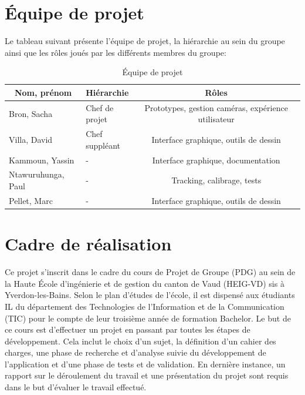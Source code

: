 \documentclass[11pt,a4paper,oldfontcommands]{memoir}
\begin{document}
\section{Équipe de projet}

Le tableau suivant présente l'équipe de projet, la hiérarchie au sein du groupe ainsi que les rôles joués par les différents membres du groupe:

\begin{table}[h]
\centering
\begin{tabular}{|l|l|c|l|}
\hline
\multicolumn{1}{|c|}{\textbf{Nom, prénom}} & \textbf{Hiérarchie}                 & \multicolumn{1}{c|}{\textbf{Rôles}} \\ \hline
Bron, Sacha                & \multicolumn{1}{l|}{Chef de projet} & Prototypes, gestion caméras, expérience utilisateur                                    \\ \hline
Villa, David               & \multicolumn{1}{l|}{Chef suppléant} & Interface graphique, outils de dessin                                    \\ \hline
Kammoun, Yassin            & -                                   & Interface graphique, documentation                                    \\ \hline
Ntawuruhunga, Paul         & -                                   & Tracking, calibrage, tests                                    \\ \hline
Pellet, Marc               & -                                   & Interface graphique, outils de dessin                                    \\ \hline
\end{tabular}
\caption{Équipe de projet}
\end{table}

\section{Cadre de réalisation}

Ce projet s'inscrit dans le cadre du cours de Projet de Groupe (PDG) au sein de la Haute École d'ingénierie et de gestion du canton de Vaud (HEIG-VD) sis à Yverdon-les-Bains. Selon le plan d'études de l'école, il est dispensé aux étudiants IL du département des Technologies de l'Information et de la Communication (TIC) pour le compte de leur troisième année de formation Bachelor. Le but de ce cours est d’effectuer un projet en passant par toutes les étapes de développement. Cela inclut le choix d'un sujet, la définition d’un cahier des charges, une phase de recherche et d'analyse suivie du développement de l’application et d’une phase de tests et de validation. En dernière instance, un rapport sur le déroulement du travail et une présentation du projet sont requis dans le but d'évaluer le travail effectué.
\end{document}
